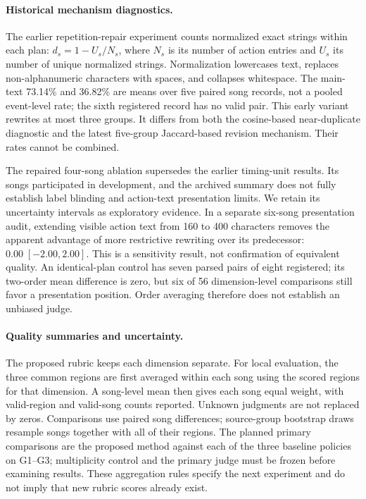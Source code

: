 \paragraph{Historical mechanism diagnostics.}
The earlier repetition-repair experiment counts normalized exact
strings within each plan: $d_s=1-U_s/N_s$, where $N_s$ is its number
of action entries and $U_s$ its number of unique normalized strings.
Normalization lowercases text, replaces non-alphanumeric characters
with spaces, and collapses whitespace. The main-text 73.14\% and 36.82\%
are means over five paired song records, not a pooled event-level rate;
the sixth registered record has no valid pair. This early variant
rewrites at most three groups. It differs from both the cosine-based
near-duplicate diagnostic and the latest five-group Jaccard-based
revision mechanism. Their rates cannot be combined.

The repaired four-song ablation supersedes the earlier timing-unit
results. Its songs participated in development, and the archived
summary does not fully establish label blinding and action-text
presentation limits. We retain its uncertainty intervals as exploratory
evidence. In a separate six-song presentation audit, extending visible
action text from 160 to 400 characters removes the apparent advantage
of more restrictive rewriting over its predecessor: $0.00\;[-2.00,2.00]$.
This is a sensitivity result, not confirmation of equivalent quality.
An identical-plan control has seven parsed pairs of eight registered;
its two-order mean difference is zero, but six of 56 dimension-level
comparisons still favor a presentation position. Order averaging
therefore does not establish an unbiased judge.

\paragraph{Quality summaries and uncertainty.}
The proposed rubric keeps each dimension separate. For local evaluation,
the three common regions are first averaged within each song using the
scored regions for that dimension. A song-level mean then gives each
song equal weight, with valid-region and valid-song counts reported.
Unknown judgments are not replaced by zeros.
Comparisons use paired song differences; source-group bootstrap draws
resample songs together with all of their regions. The planned primary
comparisons are the proposed method against each of the three baseline
policies on G1--G3; multiplicity control and the primary judge must be
frozen before examining results. These aggregation rules specify the
next experiment and do not imply that new rubric scores already exist.

